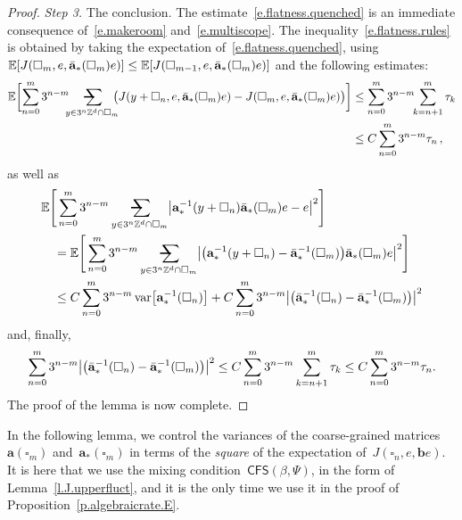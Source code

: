 \documentclass[11pt,twoside]{article} %
\makeatletter
\let\oldsquare\square %
\renewcommand{\square}{\oldsquare}
\numberwithin{equation}{section}
\theoremstyle{definition}
\let\originalleft\left
\let\originalright\right
\renewcommand{\left}{\mathopen{}\mathclose\bgroup\originalleft}
\renewcommand{\right}{\aftergroup\egroup\originalright}
\newcommand*{\Zd}{\ensuremath{\mathbb{Z}^d}}
\renewcommand{\b}{\ensuremath{\mathbf{b}}}
\renewcommand{\a}{\mathbf{a}}
\newcommand{\ahom}{\bar{\a}}
\newcommand{\cu}{\square}
\newcommand{\E}{\mathbb{E}}
\DeclareMathOperator{\var}{var}
\newcommand{\avsum}{\mathop{\mathpalette\avsuminner\relax}\displaylimits}
\newcommand\avsuminner[2]{%
  {\sbox0{$\m@th#1\sum$}%
   \vphantom{\usebox0}%
   \ooalign{%
     \hidewidth
     \smash{\,\rule[.23em]{8.8pt}{1.1pt} \relax}%
     \hidewidth\cr
   ~$\m@th#1\sum$\cr
   }%
  }%
}
\newcommand{\CFS}{\mathsf{CFS}}
\makeatother
\begin{document}
\begin{proof}
\smallskip

\emph{Step 3.} The conclusion. The estimate~\eqref{e.flatness.quenched}
is an immediate consequence of~\eqref{e.makeroom} and~\eqref{e.multiscope}.
The inequality~\eqref{e.flatness.rules} is obtained by taking the expectation of~\eqref{e.flatness.quenched}, using 
$\E \left[ J(\cu_m,e,\ahom_*(\cu_m)e) \right] \leq \E \left[ J(\cu_{m-1},e,\ahom_*(\cu_m)e) \right]$ and the following estimates:
\begin{align*}
\E\biggl [
\sum_{n=0}^{{m}} 3^{n-m} \!\!\!
\avsum_{y\in 3^{n}\Zd\cap \cu_m} \!\!\!
\bigl ( J(y+\cu_{n},e,\ahom_*(\cu_m)e) - J (\cu_m,e,\ahom_*(\cu_m)e) \bigr ) \biggr ]
&
\leq
\sum_{n=0}^{{m}} 3^{n-m} \!\!
\sum_{k=n+1}^{{m}} \tau_k 
\\ &
\leq
C\sum_{n=0}^{{m}} 3^{n-m} \tau_n\,,
\end{align*}
as well as
\begin{align*}
\lefteqn{
\E \Bigg[
\sum_{n=0}^{{m}} 3^{n-m} 
\avsum_{y\in 3^n\Zd\cap \cu_{m}} 
\left| \a_*^{-1}(y+\cu_n) \ahom_*(\cu_m)e - e\right|^2
\Bigg]
} \quad & 
\notag \\ & 
=
\E \Bigg[
\sum_{n=0}^{{m}} 3^{n-m} 
\avsum_{y\in 3^n\Zd\cap \cu_{m}} 
\left| \bigl(
\a_*^{-1}(y+\cu_n) - \ahom_*^{-1} (\cu_m) \bigr) \ahom_*(\cu_m) e
\right|^2
\Bigg]
\\ & 
\leq 
C
\sum_{n=0}^{{m}} 3^{n-m} 
\var \bigl[  \a_*^{-1}(\cu_n) \bigr]
+
C
\sum_{n=0}^{{m}} 3^{n-m} 
\left| \bigl(
\ahom_*^{-1}(\cu_n) - \ahom_*^{-1} (\cu_m) \bigr) 
\right|^2
\end{align*}
and, finally, 
\begin{equation*}
\sum_{n=0}^{{m}} 3^{n-m} 
\left| \bigl(
\ahom_*^{-1}(\cu_n) - \ahom_*^{-1} (\cu_m) \bigr) 
\right|^2
\leq 
C\sum_{n=0}^{{m}} 
3^{n-m} \sum_{k=n+1}^m \tau_k
\leq 
C\sum_{n=0}^{{m}} 
3^{n-m} \tau_n.
\end{equation*}
The proof of the lemma is now complete.
\end{proof}

In the following lemma, we control the variances of the coarse-grained matrices~$\a(\cu_m)$ and~$\a_*(\cu_m)$ in terms of the \emph{square} of the expectation of~$J(\cu_n,e,\b e)$.
It is here that we use the mixing condition~$\CFS(\beta,\Psi)$, in the form of Lemma~\ref{l.J.upperfluct}, and it is the only time we use it in the proof of Proposition~\ref{p.algebraicrate.E}. 
\end{document}
